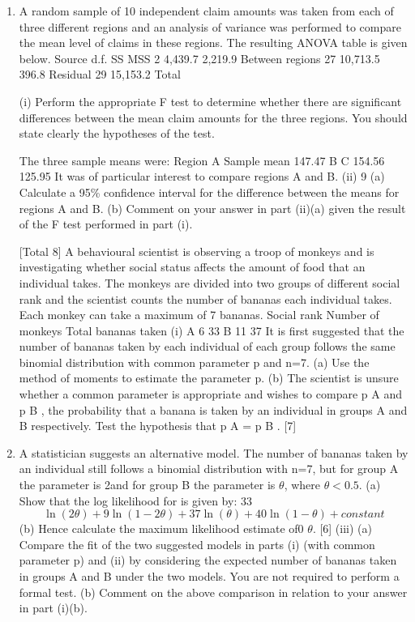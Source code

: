 \documentclass[a4paper,12pt]{article}
\begin{document}
\begin{enumerate}

\item A random sample of 10 independent claim amounts was taken from each of three
different regions and an analysis of variance was performed to compare the mean
level of claims in these regions. The resulting ANOVA table is given below.
Source
d.f.
SS
MSS
2
4,439.7
2,219.9
Between regions
27 10,713.5 396.8
Residual
29 15,153.2
Total

(i)
Perform the appropriate F test to determine whether there are significant
differences between the mean claim amounts for the three regions. You
should state clearly the hypotheses of the test.

The three sample means were:
Region
A
Sample mean 147.47
B
C
154.56 125.95
It was of particular interest to compare regions A and B.
(ii)
9
(a) Calculate a 95\% confidence interval for the difference between the
means for regions A and B.
(b) Comment on your answer in part (ii)(a) given the result of the F test
performed in part (i).

[Total 8]
A behavioural scientist is observing a troop of monkeys and is investigating whether
social status affects the amount of food that an individual takes. The monkeys are
divided into two groups of different social rank and the scientist counts the number of
bananas each individual takes. Each monkey can take a maximum of 7 bananas.
Social rank
Number of monkeys
Total bananas taken
(i)
A
6
33
B
11
37
It is first suggested that the number of bananas taken by each individual of each group follows the same binomial distribution with common parameter p
and n=7.
(a) Use the method of moments to estimate the parameter p.
(b) The scientist is unsure whether a common parameter is appropriate and wishes to compare p A and p B , the probability that a banana is taken
by an individual in groups A and B respectively.
Test the hypothesis that p A = p B .
[7]
\item 
A statistician suggests an alternative model. The number of bananas taken by
an individual still follows a binomial distribution with n=7, but for group A
the parameter is 2\theta and for group B the parameter is $\theta$, where $\theta < 0.5$.
(a)
Show that the log likelihood for \theta is given by:
33
\[\ln ( 2 \theta ) + 9 \ln ( 1 − 2 \theta ) + 37 \ln ( \theta ) + 40 \ln ( 1 − \theta ) + constant\]
(b)
Hence calculate the maximum likelihood estimate of0 $\theta$.
[6]
(iii)
(a) Compare the fit of the two suggested models in parts (i) (with common
parameter p) and (ii) by considering the expected number of bananas
taken in groups A and B under the two models. You are not required
to perform a formal test.
(b) Comment on the above comparison in relation to your answer in
part (i)(b).


\end{enumerate}
\end{document}
